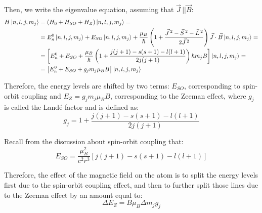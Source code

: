 Then, we write the eigenvalue equation, assuming that $\vec{J}\,||\vec{B}$:%
\begin{equation}
    \begin{split}
        H\ket{n,l,j,m_j} &= (H_0+H_{SO}+H_Z)\ket{n,l,j,m_j} =\\
        &= E_n^0\ket{n,l,j,m_j} + E_{SO}\ket{n,l,j,m_j} + \frac{\mu_B}{\hbar} \left(1+ \frac{\vec{J}\,^2 - \vec{S}\,^2 - \vec{L}\,^2}{2\vec{J}\,^2}\right)\vec{J}\cdot \vec{B} \ket{n,l,j,m_j} = \\
        &= \left[ E_n^0 + E_{SO} + \frac{\mu_B}{\hbar}\left(1+\frac{j(j+1)-s(s+1)-l(l+1)}{2j(j+1)}\right)\hbar m_jB\right]\ket{n,l,j,m_j}=\\
        &= \left[E_n^0 + E_{SO} + g_jm_j\mu_B B\right]\ket{n,l,j,m_j}
    \end{split}
\end{equation}

Therefore, the energy levels are shifted by two terms: $E_{SO}$, corresponding to spin-orbit coupling and $E_Z = g_jm_j\mu_B B$, corresponding to the Zeeman effect, where $g_j$ is called the Landé factor and is defined as:
\begin{equation}
    g_j = 1 + \frac{j(j+1) - s(s+1)-l(l+1)}{2j(j+1)}
\end{equation}

Recall from the discussion about spin-orbit coupling that:
\begin{equation}
    E_{SO} = \frac{\mu_B^2}{c^2r^3} \left[j(j+1)-s(s+1)-l(l+1)\right]
\end{equation}

Therefore, the effect of the magnetic field on the atom is to split the energy levels first due to the spin-orbit coupling effect, and then to further split those lines due to the Zeeman effect by an amount equal to:
\begin{equation}
    \Delta E_Z = B\mu_B\Delta m_jg_j
\end{equation}

